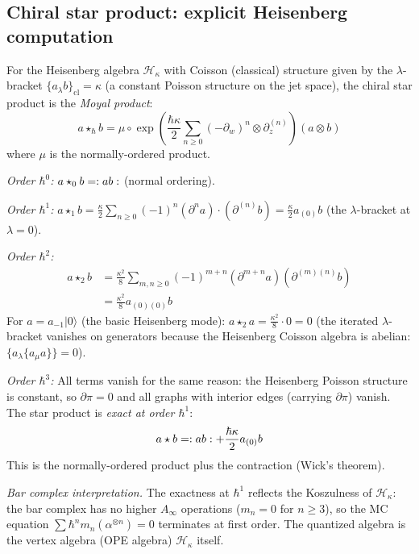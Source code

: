 \subsection{Chiral star product: explicit Heisenberg computation}

\begin{computation}
\label{comp:heisenberg-star-product}

For the Heisenberg algebra $\mathcal{H}_\kappa$ with Coisson
(classical) structure given by the $\lambda$-bracket
$\{a_\lambda b\}_{\mathrm{cl}} = \kappa$ (a constant Poisson
structure on the jet space), the chiral star product is the
\emph{Moyal product}:
\begin{equation}\label{eq:heisenberg-moyal}
a \star_\hbar b = \mu \circ \exp\left(
\frac{\hbar \kappa}{2}
\sum_{n \geq 0} (-\partial_w)^n \otimes \partial_z^{(n)}
\right)(a \otimes b)
\end{equation}
where $\mu$ is the normally-ordered product.

\emph{Order $\hbar^0$:} $a \star_0 b = :{ab}:$
(normal ordering).

\emph{Order $\hbar^1$:} $a \star_1 b = \frac{\kappa}{2}
\sum_{n \geq 0} (-1)^n (\partial^n a) \cdot
(\partial^{(n)} b) = \frac{\kappa}{2} a_{(0)}b$ (the
$\lambda$-bracket at $\lambda = 0$).

\emph{Order $\hbar^2$:}
\begin{align*}
a \star_2 b &= \frac{\kappa^2}{8}
\sum_{m,n \geq 0} (-1)^{m+n}
(\partial^{m+n} a)(\partial^{(m)(n)} b) \\
&= \frac{\kappa^2}{8} a_{(0)(0)}b
\end{align*}
For $a = a_{-1}|0\rangle$ (the basic Heisenberg mode):
$a \star_2 a = \frac{\kappa^2}{8} \cdot 0 = 0$ (the iterated
$\lambda$-bracket vanishes on generators because the Heisenberg
Coisson algebra is abelian: $\{a_\lambda\{a_\mu a\}\} = 0$).

\emph{Order $\hbar^3$:}
All terms vanish for the same reason: the Heisenberg Poisson
structure is constant, so $\partial \pi = 0$ and all graphs with
interior edges (carrying $\partial \pi$) vanish.  The star product
is \emph{exact at order $\hbar^1$}:
\begin{equation}\label{eq:heisenberg-exact}
a \star b = :{ab}: + \frac{\hbar\kappa}{2} a_{(0)}b
\end{equation}
This is the normally-ordered product plus the contraction (Wick's
theorem).

\emph{Bar complex interpretation.}
The exactness at $\hbar^1$ reflects the Koszulness of
$\mathcal{H}_\kappa$: the bar complex has no higher $A_\infty$
operations ($m_n = 0$ for $n \geq 3$), so the MC equation
$\sum \hbar^n m_n(\alpha^{\otimes n}) = 0$ terminates at first
order.  The quantized algebra is the vertex algebra (OPE algebra)
$\mathcal{H}_\kappa$ itself.
\end{computation}

